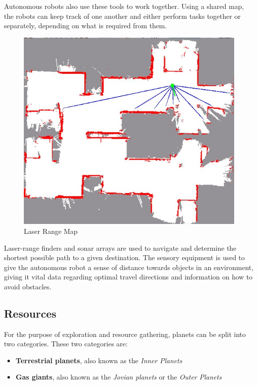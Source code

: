 Autonomous robots also use these tools to work together. Using a shared map, the robots can keep track of one another and either perform tasks together or separately, depending on what is required from them.

\begin{figure}[H]
	\centering
	\includegraphics[scale=.7]{images/laserrangemap.jpg}
	\caption{Laser Range Map\cite{laserrangepic}}
	\label{fig:laserrangemap}
\end{figure}

Laser-range finders and sonar arrays are used to navigate and determine the shortest possible path to a given destination. The sensory equipment is used to give the autonomous robot a sense of distance towards objects in an environment, giving it vital data regarding optimal travel directions and information on how to avoid obstacles\cite{lasersonar}.

\subsection{Resources}
For the purpose of exploration and resource gathering, planets can be split into two categories. These two categories are:\cite{planettypes}
\begin{itemize}
	\item{\textbf{Terrestrial planets}, also known as the \textit{Inner Planets}}
	\item{\textbf{Gas giants}, also known as the \textit{Jovian planets} or the \textit{Outer Planets}}
\end{itemize}

